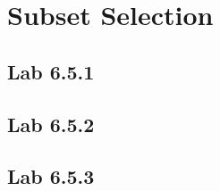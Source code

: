 \chapter{Subset Selection}
\label{chp:subsel}

\section{Lab 6.5.1}

\section{Lab 6.5.2}

\section{Lab 6.5.3}